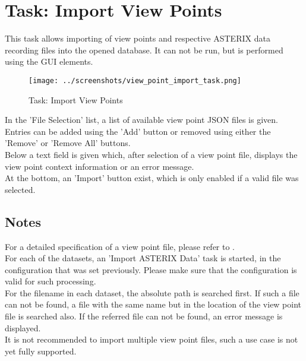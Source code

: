 \section{Task: Import View Points}
\label{sec:task_import_view_points} 

This task allows importing of view points and respective ASTERIX data recording files into the opened database. It can not be run, but is performed using the GUI elements. \\

\begin{figure}[H]
  \hspace*{-2.5cm}
    \texttt{[image: ../screenshots/view\_point\_import\_task.png]}
  \caption{Task: Import View Points}
\end{figure}

In the 'File Selection' list, a list of available view point JSON files is given. Entries can be added using the 'Add' button or removed using either the 'Remove' or 'Remove All' buttons. \\

Below a text field is given which, after selection of a view point file, displays the view point context information or an error message. \\

At the bottom, an 'Import' button exist, which is only enabled if a valid file was selected.

\subsection{Notes}

For a detailed specification of a view point file, please refer to . \\

For each of the datasets, an 'Import ASTERIX Data' task is started, in the configuration that was set previously. Please make sure that the configuration is valid for such processing. \\

For the filename in each dataset, the absolute path is searched first. If such a file can not be found, a file with the same name but in the location of the view point file is searched also. If the referred file can not be found, an error message is displayed. \\

It is not recommended to import multiple view point files, such a use case is not yet fully supported.

